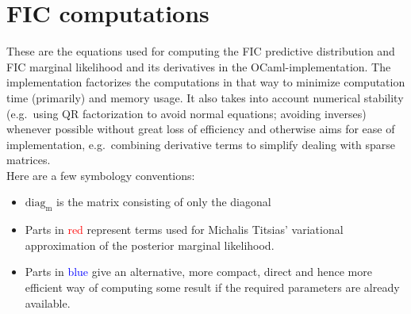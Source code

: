 \documentclass[10pt]{article}
\newcommand{\red}{\textcolor{red}}
\newcommand{\blue}{\textcolor{blue}}
\begin{document}
\section{FIC computations}

These are the equations used for computing the FIC predictive
distribution and FIC marginal likelihood and its derivatives in the
OCaml-implementation.  The implementation factorizes the computations
in that way to minimize computation time (primarily) and memory
usage.  It also takes into account numerical stability (e.g.\ using
QR factorization to avoid normal equations; avoiding inverses)
whenever possible without great loss of efficiency and otherwise
aims for ease of implementation, e.g.\ combining derivative terms
to simplify dealing with sparse matrices.\\

Here are a few symbology conventions:

\begin{itemize}
\item $\mathrm{diag_m}$ is the matrix consisting of only the diagonal
\item Parts in \red{red} represent terms used for Michalis Titsias'
variational approximation of the posterior marginal likelihood.
\item Parts in \blue{blue} give an alternative, more compact, direct
and hence more efficient way of computing some result if the required
parameters are already available.
\end{itemize}
\end{document}
